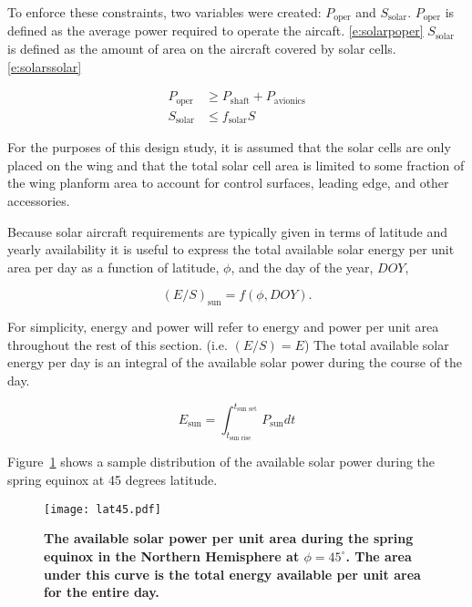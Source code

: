 \documentclass[]{aiaa-tc}%
\begin{document}
    To enforce these constraints, two variables were created: $P_{\text{oper}}$ and $S_{\text{solar}}$. 
    $P_{\text{oper}}$ is defined as the average power required to operate the aircaft. \eqref{e:solarpoper} 
    $S_{\text{solar}}$ is defined as the amount of area on the aircraft covered by solar cells. \eqref{e:solarssolar}

    \begin{align}
        \label{e:solarpoper}
        P_{\text{oper}} &\geq P_{\text{shaft}} + P_{\text{avionics}} \\
        \label{e:solarssolar}
        S_{\text{solar}} &\leq f_{\text{solar}}S
    \end{align}

    For the purposes of this design study, it is assumed that the solar cells are only placed on the wing and that the total solar cell area is limited to some fraction of the wing planform area to account for control surfaces, leading edge, and other accessories.

    Because solar aircraft requirements are typically given in terms of latitude and yearly availability it is useful to express the total available solar energy per unit area per day as a function of latitude, $\phi$, and the day of the year, $DOY$, 
    
    \begin{equation}
        \label{e:solarfunc}
        (E/S)_{\text{sun}} = f(\phi, DOY).
    \end{equation}


    For simplicity, energy and power will refer to energy and power per unit area throughout the rest of this section. (i.e. $(E/S) = E$) The total available solar energy per day is an integral of the available solar power during the course of the day.

    \begin{equation}
        \label{e:solares}
        E_{\text{sun}} = \int_{t_{\text{sun rise}}}^{t_{\text{sun set}}} P_{\text{sun}} dt
    \end{equation}

    Figure~\ref{f:lat45} shows a sample distribution of the available solar power during the spring equinox at 45 degrees latitude. 
    
\begin{figure}[H]
	\begin{center}
	\texttt{[image: lat45.pdf]}
    \caption{ \textbf{ The available solar power per unit area during the spring equinox in the Northern Hemisphere at $\phi=45^{\circ}$.  The area under this curve is the total energy available per unit area for the entire day.} }
	\label{f:lat45}
	\end{center}
\end{figure}
\end{document}
